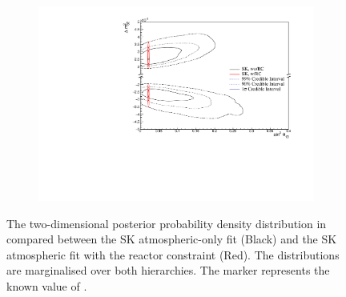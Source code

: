 \begin{figure}[h]
  \begin{subfigure}[t]{0.98\textwidth}
    \includegraphics[width=\textwidth, trim={0mm 0mm 0mm 0mm}, clip,page=1]{Figures/OA/SKOnlyFit_wRC/ContourComparison_2D_th13_dm32_BH_0_wRC_woRC_UnSmeared_CredibleInterval.pdf}
  \end{subfigure}
    \caption{The two-dimensional posterior probability density distribution in  compared between the SK atmospheric-only fit (Black) and the SK atmospheric fit with the reactor constraint (Red). The distributions are marginalised over both hierarchies. The marker represents the known value of .}
  \label{fig:OscillationAnalysis_SKOnly_DELM32TH13_WRC}
\end{figure}

